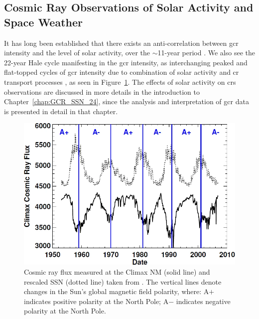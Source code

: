 \subsection{Cosmic Ray Observations of Solar Activity and Space Weather}

It has long been established that there exists an anti-correlation between \gls{gcr} intensity and the level of solar activity, over the $\sim$11-year period \citep{forbush_cosmic-ray_1958, parker_passage_1965, usoskin_correlative_1998, van_allen_modulation_2000}. We also see the 22-year Hale cycle manifesting in the \gls{gcr} intensity, as interchanging peaked and flat-topped cycles of \gls{gcr} intensity due to combination of solar activity and \gls{cr} transport processes \citep{aslam_solar_2012, thomas_22-year_2014}, as seen in Figure~\ref{fig:gcr_plot}. The effects of solar activity on \glspl{cr} observations are discussed in more details in the introduction to Chapter~\ref{chap:GCR_SSN_24}, since the analysis and interpretation of \gls{gcr} data is presented in detail in that chapter.

\begin{figure}[ht!]
	\centering
	\includegraphics[width=0.95\columnwidth]{gcr.png}
	\caption{Cosmic ray flux measured at the Climax NM (solid line) and rescaled SSN (dotted line) taken from \citet{hathaway_solar_2015}. The vertical lines denote changes in the Sun's global magnetic field polarity, where: A$+$ indicates positive polarity at the North Pole; A$-$ indicates negative polarity at the North Pole.}
	\label{fig:gcr_plot}
\end{figure}

